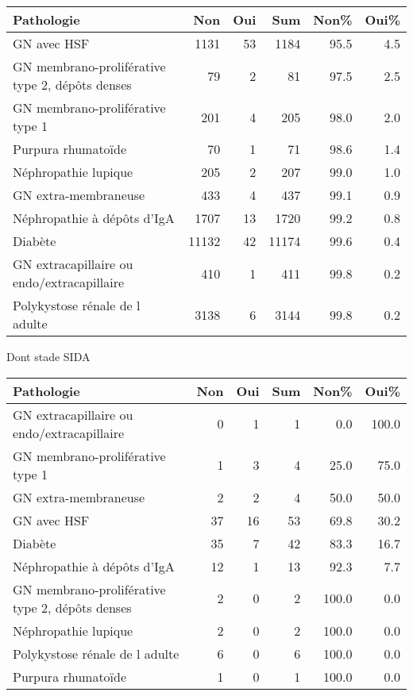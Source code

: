 \documentclass[11pt,a4paper]{article}\usepackage[]{graphicx}\usepackage[]{color}
\begin{document}
\begin{table}[H]
\centering
\begin{tabular}{lrrrrr}
  \hline
Pathologie & Non & Oui & Sum & Non\% & Oui\% \\ 
  \hline
GN avec HSF & 1131 & 53 & 1184 & 95.5 & 4.5 \\ 
  GN membrano-proliférative type 2, dépôts denses & 79 &  2 & 81 & 97.5 & 2.5 \\ 
  GN membrano-proliférative type 1 & 201 &  4 & 205 & 98.0 & 2.0 \\ 
  Purpura rhumatoïde & 70 &  1 & 71 & 98.6 & 1.4 \\ 
  Néphropathie lupique & 205 &  2 & 207 & 99.0 & 1.0 \\ 
  GN extra-membraneuse & 433 &  4 & 437 & 99.1 & 0.9 \\ 
  Néphropathie à dépôts d'IgA & 1707 & 13 & 1720 & 99.2 & 0.8 \\ 
  Diabète & 11132 & 42 & 11174 & 99.6 & 0.4 \\ 
  GN extracapillaire ou endo/extracapillaire & 410 &  1 & 411 & 99.8 & 0.2 \\ 
  Polykystose rénale de l adulte & 3138 &  6 & 3144 & 99.8 & 0.2 \\ 
   \hline
\end{tabular}
\end{table}


Dont stade SIDA 

\begin{table}[H]
\centering
\begin{tabular}{lrrrrr}
  \hline
Pathologie & Non & Oui & Sum & Non\% & Oui\% \\ 
  \hline
GN extracapillaire ou endo/extracapillaire &  0 &  1 &  1 & 0.0 & 100.0 \\ 
  GN membrano-proliférative type 1 &  1 &  3 &  4 & 25.0 & 75.0 \\ 
  GN extra-membraneuse &  2 &  2 &  4 & 50.0 & 50.0 \\ 
  GN avec HSF & 37 & 16 & 53 & 69.8 & 30.2 \\ 
  Diabète & 35 &  7 & 42 & 83.3 & 16.7 \\ 
  Néphropathie à dépôts d'IgA & 12 &  1 & 13 & 92.3 & 7.7 \\ 
  GN membrano-proliférative type 2, dépôts denses &  2 &  0 &  2 & 100.0 & 0.0 \\ 
  Néphropathie lupique &  2 &  0 &  2 & 100.0 & 0.0 \\ 
  Polykystose rénale de l adulte &  6 &  0 &  6 & 100.0 & 0.0 \\ 
  Purpura rhumatoïde &  1 &  0 &  1 & 100.0 & 0.0 \\ 
   \hline
\end{tabular}
\end{table}
\end{document}
